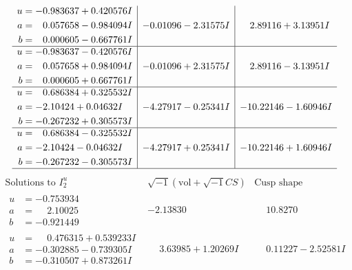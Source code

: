 \documentclass[1p]{elsarticle_modified}
\theoremstyle{definition}
\newcommand{\I}{\sqrt{-1}}
\begin{document}
$$\begin{array}{c|c|c}
\begin{aligned}
u &= -0.983637 + 0.420576 I \\
a &= \phantom{-}0.057658 - 0.984094 I \\
b &= \phantom{-}0.000605 - 0.667761 I\end{aligned}
 & -0.01096 - 2.31575 I & \phantom{-}2.89116 + 3.13951 I \\ \hline\begin{aligned}
u &= -0.983637 - 0.420576 I \\
a &= \phantom{-}0.057658 + 0.984094 I \\
b &= \phantom{-}0.000605 + 0.667761 I\end{aligned}
 & -0.01096 + 2.31575 I & \phantom{-}2.89116 - 3.13951 I \\ \hline\begin{aligned}
u &= \phantom{-}0.686384 + 0.325532 I \\
a &= -2.10424 + 0.04632 I \\
b &= -0.267232 + 0.305573 I\end{aligned}
 & -4.27917 - 0.25341 I & -10.22146 - 1.60946 I \\ \hline\begin{aligned}
u &= \phantom{-}0.686384 - 0.325532 I \\
a &= -2.10424 - 0.04632 I \\
b &= -0.267232 - 0.305573 I\end{aligned}
 & -4.27917 + 0.25341 I & -10.22146 + 1.60946 I\\
 \hline 
 \end{array}$$\newpage$$\begin{array}{c|c|c}  
\text{Solutions to }I^u_{2}& \I (\text{vol} + \sqrt{-1}CS) & \text{Cusp shape}\\
 \hline 
\begin{aligned}
u &= -0.753934\phantom{ +0.000000I} \\
a &= \phantom{-}2.10025\phantom{ +0.000000I} \\
b &= -0.921449\phantom{ +0.000000I}\end{aligned}
 & -2.13830\phantom{ +0.000000I} & \phantom{-}10.8270\phantom{ +0.000000I} \\ \hline\begin{aligned}
u &= \phantom{-}0.476315 + 0.539233 I \\
a &= -0.302885 - 0.739305 I \\
b &= -0.310507 + 0.873261 I\end{aligned}
 & \phantom{-}3.63985 + 1.20269 I & \phantom{-}0.11227 - 2.52581 I \\ \hline\begin{aligned}

\end{aligned}
\end{array}$$
\end{document}
